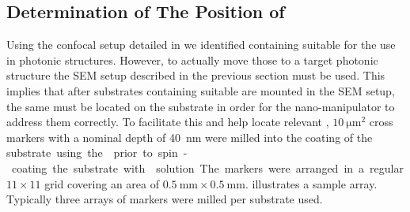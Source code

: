	\subsection{Determination of The Position of \Nds} \label{subsec::position}

		Using the confocal setup detailed in  we identified \nds containing \sivs suitable for the use in photonic structures. However, to actually move those \nds to a target photonic structure the SEM setup described in the previous section must be used. This implies that after substrates containing suitable \nds are mounted in the SEM setup, the same \nds must be located on the substrate in order for the nano-manipulator to address them correctly.
		To facilitate this and help locate relevant \nds, $\SI{10}{\micro\meter\squared}$ cross markers with a nominal depth of \SI{40}{\nm} were milled into the \ir coating of the \si substrate using the \fib prior to spin-coating the substrate with \nd solution. The markers were arranged in a regular $11 \times 11$ grid covering an area of $\SI{0.5}{\milli\meter} \times \SI{0.5}{\milli\meter}$.  illustrates a sample array. Typically three arrays of markers were milled per substrate used.

